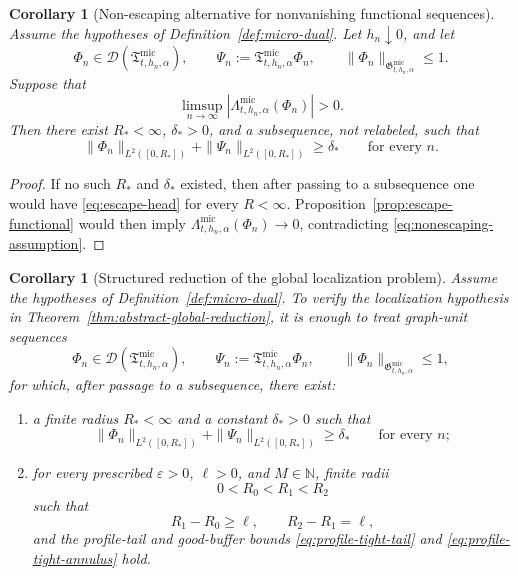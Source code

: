 \documentclass[11pt,a4paper]{amsart}
\theoremstyle{plain}
\newtheorem{corollary}[theorem]{Corollary}
\theoremstyle{definition}
\theoremstyle{remark}
\begin{document}
\begin{corollary}[Non-escaping alternative for nonvanishing functional sequences]
\label{cor:nonescaping}
Assume the hypotheses of Definition~\ref{def:micro-dual}. Let \(h_n\downarrow0\), and let
\[
\Phi_n\in\mathcal D(\mathfrak T_{t,h_n,\alpha}^{\mathrm{mic}}),
\qquad
\Psi_n:=\mathfrak T_{t,h_n,\alpha}^{\mathrm{mic}}\Phi_n,
\qquad
\|\Phi_n\|_{\mathfrak G_{t,h_n,\alpha}^{\mathrm{mic}}}\le1.
\]
Suppose that
\begin{equation}\label{eq:nonescaping-assumption}
\limsup_{n\to\infty}
\left|
\Lambda_{t,h_n,\alpha}^{\mathrm{mic}}(\Phi_n)
\right|
>0.
\end{equation}
Then there exist \(R_*<\infty\), \(\delta_*>0\), and a subsequence, not relabeled, such that
\begin{equation}\label{eq:nonescaping-head}
\|\Phi_n\|_{L^2([0,R_*])}
+
\|\Psi_n\|_{L^2([0,R_*])}
\ge
\delta_*
\qquad\text{for every }n.
\end{equation}
\end{corollary}

\begin{proof}
If no such \(R_*\) and \(\delta_*\) existed, then after passing to a subsequence one would have
\eqref{eq:escape-head} for every \(R<\infty\). Proposition~\ref{prop:escape-functional} would then
imply \(\Lambda_{t,h_n,\alpha}^{\mathrm{mic}}(\Phi_n)\to0\), contradicting
\eqref{eq:nonescaping-assumption}.
\end{proof}

\begin{corollary}[Structured reduction of the global localization problem]
\label{cor:structured-reduction}
Assume the hypotheses of Definition~\ref{def:micro-dual}. To verify the localization hypothesis in
Theorem~\ref{thm:abstract-global-reduction}, it is enough to treat graph-unit sequences
\[
\Phi_n\in\mathcal D(\mathfrak T_{t,h_n,\alpha}^{\mathrm{mic}}),
\qquad
\Psi_n:=\mathfrak T_{t,h_n,\alpha}^{\mathrm{mic}}\Phi_n,
\qquad
\|\Phi_n\|_{\mathfrak G_{t,h_n,\alpha}^{\mathrm{mic}}}\le1,
\]
for which, after passage to a subsequence, there exist:
\begin{enumerate}[label=(\roman*)]
\item a finite radius \(R_*<\infty\) and a constant \(\delta_*>0\) such that
\[
\|\Phi_n\|_{L^2([0,R_*])}
+
\|\Psi_n\|_{L^2([0,R_*])}
\ge
\delta_*
\qquad\text{for every }n;
\]
\item for every prescribed \(\varepsilon>0\), \(\ell>0\), and \(M\in\mathbb N\), finite radii
\[
0<R_0<R_1<R_2
\]
such that
\[
R_1-R_0\ge\ell,
\qquad
R_2-R_1=\ell,
\]
and the profile-tail and good-buffer bounds
\eqref{eq:profile-tight-tail} and \eqref{eq:profile-tight-annulus} hold.
\end{enumerate}
\end{corollary}
\end{document}
